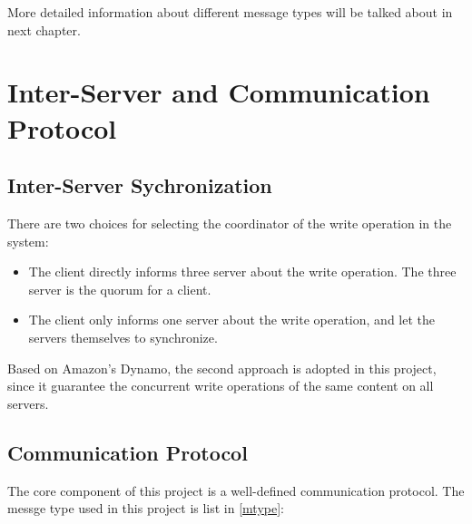 \documentclass[11pt,letterpaper,en-US]{article}
\begin{document}
More detailed information about different message types will be talked about in next chapter.

\section{Inter-Server and Communication Protocol}
\subsection{Inter-Server Sychronization}
There are two choices for selecting the coordinator of the write operation in the system:
\begin{itemize}
    \item The client directly informs three server about the write operation.
        The three server is the quorum for a client.
    \item The client only informs one server about the write operation,
        and let the servers themselves to synchronize.
\end{itemize}
Based on Amazon's Dynamo\cite{amazon1}, the second approach is adopted in this project,
since it guarantee the concurrent write operations of the same content on all servers.

\subsection{Communication Protocol}
The core component of this project is a well-defined communication protocol\cite{liang1}.
The messge type used in this project is list in \cref{mtype}:
\end{document}
